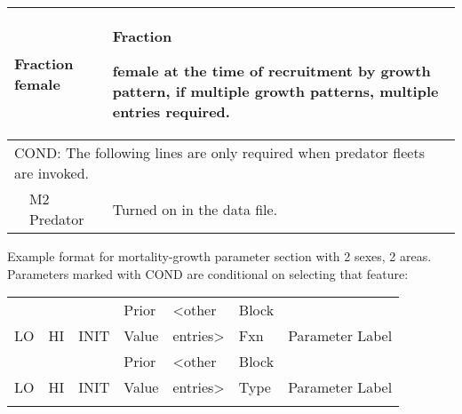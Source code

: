 \begin{longtable}{p{1cm} p{2.25cm} p{10cm}}
	\multicolumn{2}{l}{Fraction female}\Tstrut & \hypertarget{SexRatio}{Fraction} female at the time of recruitment by growth pattern, if multiple growth patterns, multiple entries required. \Bstrut\\
	\hline
	
	\multicolumn{3}{l}{COND: The following lines are only required when predator fleets are invoked.} \Tstrut\\
	& M2 Predator & Turned on in the data file. \\
	\hline
\end{longtable}


Example format for mortality-growth parameter section with 2 sexes, 2 areas.
Parameters marked with COND are conditional on selecting that feature:
\begin{longtable}{p{1.1cm} p{1.1cm} p{1.1cm} p{1.1cm} p{1.5cm} p{1.1cm} p{6.75cm}}
	\hline
	   &	&	   & Prior & <other & Block & \Tstrut\\
	LO & HI & INIT & Value & entries> & Fxn & Parameter Label \Bstrut\\
	\hline
	\endfirsthead

	\hline
	   &	&	   & Prior & <other & Block & \Tstrut\\
	LO & HI & INIT & Value & entries> & Type & Parameter Label \Bstrut\\
	\hline
	\endhead

	\hline
	\endfoot

	\endlastfoot


\end{longtable}
